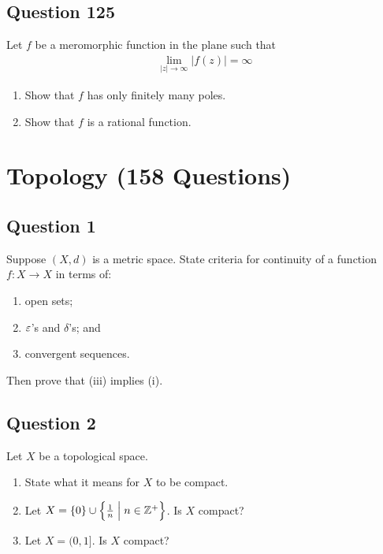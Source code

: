 \documentclass[12pt]{article}
\begin{document}
\hypertarget{question-125-1}{%
\subsection{Question 125}\label{question-125-1}}

Let \(f\) be a meromorphic function in the plane such that
\begin{align*}
\lim_{|z|\to\infty} |f(z)| = \infty
\end{align*}

\begin{enumerate}
\def\labelenumi{\arabic{enumi}.}
\item
  Show that \(f\) has only finitely many poles.
\item
  Show that \(f\) is a rational function.
\end{enumerate}

\hypertarget{topology-158-questions}{%
\section{Topology (158 Questions)}\label{topology-158-questions}}

\hypertarget{question-1-3}{%
\subsection{Question 1}\label{question-1-3}}

Suppose \((X, d)\) is a metric space. State criteria for continuity of a
function \(f : X \to X\) in terms of:

\begin{enumerate}
\def\labelenumi{\roman{enumi}.}
\item
  open sets;
\item
  \(\varepsilon\)'s and \(\delta\)'s; and
\item
  convergent sequences.
\end{enumerate}

Then prove that (iii) implies (i).

\hypertarget{question-2-3}{%
\subsection{Question 2}\label{question-2-3}}

Let \(X\) be a topological space.

\begin{enumerate}
\def\labelenumi{\roman{enumi}.}
\item
  State what it means for \(X\) to be compact.
\item
  Let \(X = \left\{{0}\right\} \cup \left\{{{1\over n} \mathrel{\Big|} n \in {\mathbb{Z}}^+ }\right\}\). Is
  \(X\) compact?
\item
  Let \(X = (0, 1]\). Is \(X\) compact?
\end{enumerate}
\end{document}

